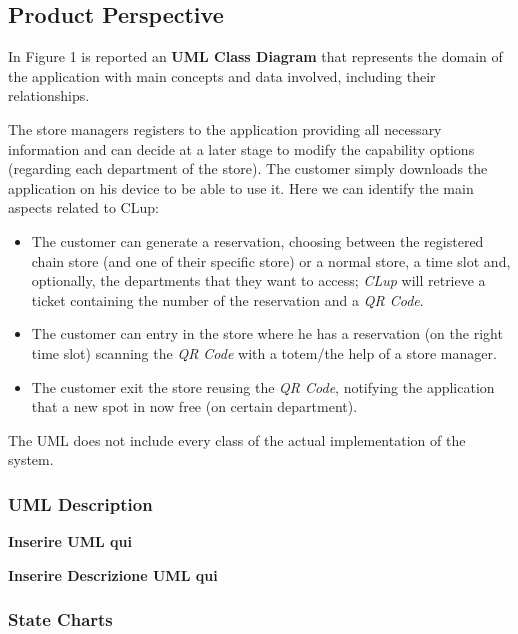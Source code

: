\documentclass{article}
\begin{document}
	\subsection{Product Perspective}
	
	In Figure 1 is reported an {\bfseries UML Class Diagram} that represents the domain of the application with main concepts and data involved, including their relationships.
	
	The store managers registers to the application providing all necessary information and can decide at a later stage to modify the capability options (regarding each department of the store). The customer simply downloads the application on his device to be able to use it. Here we can identify the main aspects related to CLup:
	
	\begin{itemize}
		
		\item The customer can generate a reservation, choosing between the registered chain store (and one of their specific store) or a normal store, a time slot and, optionally, the departments that they want to access; \emph{CLup} will retrieve a ticket containing the number of the reservation and a \emph{QR Code}.
		
		\item The customer can entry in the store where he has a reservation (on the right time slot) scanning the \emph{QR Code} with a totem/the help of a store manager.
		
		\item The customer exit the store reusing the \emph{QR Code}, notifying the application that a new spot in now free (on certain department).
		
	\end{itemize}
	
	The UML does not include every class of the actual implementation of the system.
	
		\subsubsection{UML Description}

		{\bfseries Inserire UML qui}
		
		\newpage
		{\bfseries Inserire Descrizione UML qui}
		\newpage
		
		\subsubsection{State Charts}
		
\end{document}
